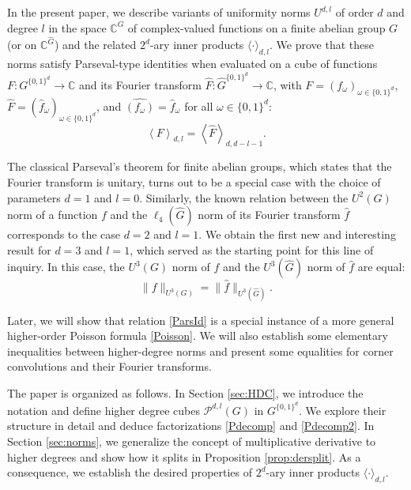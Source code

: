 \documentclass{amsart}
\theoremstyle{definition}
\theoremstyle{remark}
\numberwithin{equation}{section}
\begin{document}
In the present paper, we describe variants of uniformity norms $U^{d,l}$ of order $d$ and degree $l$ in the space $\mathbb{C}^G$ of complex-valued functions on a finite abelian group $G$ (or on  $\mathbb{C}^{\widehat{G}}$) and the related $2^d$-ary inner products $\langle \cdot \rangle_{d, l}$. We prove that these norms satisfy Parseval-type identities when evaluated on a cube of functions $F: G^{\{0,1\}^d} \to \mathbb{C}$ and its Fourier transform $\widehat{F}: \widehat{G}^{\{0,1\}^d} \to \mathbb{C}$, with $F=\left( f_\omega\right)_{\omega \in \{0,1\}^d}$, $\widehat{F}=\left( \widehat{f}_\omega\right)_{\omega \in \{0,1\}^d}$, and $\widehat{(f_\omega)} = \widehat{f}_\omega$ for all $\omega \in \{0,1\}^d$:
\begin{equation}\label{ParsId}
\left\langle F \right\rangle_{d,l} =  \left\langle \widehat{F}
\right\rangle_{d,d-l-1} .
\end{equation}

The classical Parseval's theorem for finite abelian groups, which states that the Fourier transform is unitary, 
turns out to be a special case with the choice of parameters $d=1$ and $l=0$. Similarly, the known relation between the $U^2(G)$ norm of a function $f$ and the $\ell_4(\widehat{G})$ norm of its Fourier transform $\widehat{f}$ corresponds to the case $d=2$ and $l=1$. We obtain the first new and interesting result for $d=3$ and $l=1$, which served as the starting point for this line of inquiry. In this case, the $U^3(G)$ norm of $f$ and the $U^3(\widehat{G})$ norm of $\widehat{f}$ are equal:
\begin{equation} \|f\|_{U^3(G)} = \|\widehat{f}\|_{U^3(\widehat{G})}.
\end{equation}

Later, we will show that relation \eqref{ParsId} is a special instance of a more general higher-order Poisson formula \eqref{Poisson}. We will also establish some elementary inequalities between higher-degree norms and present some equalities for corner convolutions and their Fourier transforms. 

The paper is organized as follows. In Section \ref{sec:HDC}, we introduce the notation and define higher degree cubes $\mathcal{P}^{d,l}(G)$ in $G^{\{0,1\}^d}$. We explore their structure in detail and deduce factorizations \eqref{Pdecomp} and \eqref{Pdecomp2}. In Section \ref{sec:norms}, we generalize the concept of multiplicative derivative to higher degrees and show how it splits in Proposition \ref{prop:dersplit}. As a consequence, we establish the desired properties of $2^d$-ary inner products $\langle \cdot \rangle_{d, l}$.
\end{document}
